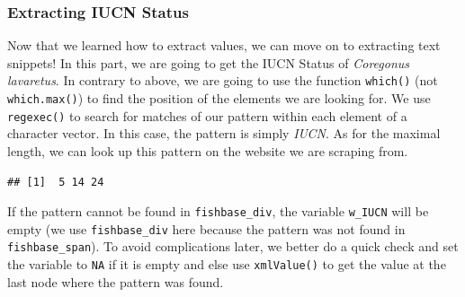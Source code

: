 \documentclass[
]{book}
\newenvironment{Shaded}{\begin{snugshade}}{\end{snugshade}}
\newcommand{\CommentTok}[1]{\textcolor[rgb]{0.56,0.35,0.01}{\textit{#1}}}
\newcommand{\DataTypeTok}[1]{\textcolor[rgb]{0.13,0.29,0.53}{#1}}
\newcommand{\DecValTok}[1]{\textcolor[rgb]{0.00,0.00,0.81}{#1}}
\newcommand{\KeywordTok}[1]{\textcolor[rgb]{0.13,0.29,0.53}{\textbf{#1}}}
\newcommand{\NormalTok}[1]{#1}
\newcommand{\OperatorTok}[1]{\textcolor[rgb]{0.81,0.36,0.00}{\textbf{#1}}}
\newcommand{\StringTok}[1]{\textcolor[rgb]{0.31,0.60,0.02}{#1}}
\begin{document}
\hypertarget{extracting-iucn-status}{%
\subsubsection*{Extracting IUCN Status}\label{extracting-iucn-status}}

Now that we learned how to extract values, we can move on to extracting text snippets! In this part, we are going to get the IUCN Status of \emph{Coregonus lavaretus}. In contrary to above, we are going to use the function \texttt{which()} (not \texttt{which.max()}) to find the position of the elements we are looking for. We use \texttt{regexec()} to search for matches of our pattern within each element of a character vector. In this case, the pattern is simply \emph{IUCN}. As for the maximal length, we can look up this pattern on the website we are scraping from.

\begin{Shaded}
\end{Shaded}

\begin{verbatim}
## [1]  5 14 24
\end{verbatim}

If the pattern cannot be found in \texttt{fishbase\_div}, the variable \texttt{w\_IUCN} will be empty (we use \texttt{fishbase\_div} here because the pattern was not found in \texttt{fishbase\_span}). To avoid complications later, we better do a quick check and set the variable to \texttt{NA} if it is empty and else use \texttt{xmlValue()} to get the value at the last node where the pattern was found.
\end{document}

